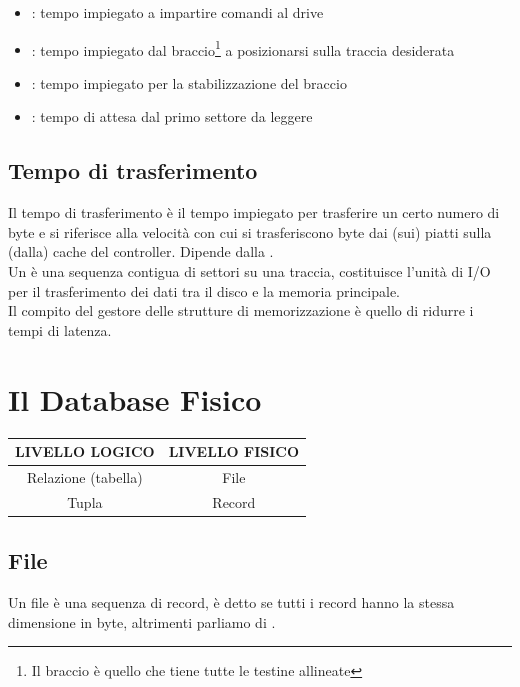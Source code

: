 \documentclass[12pt, a4paper]{report}
\begin{document}
    \begin{itemize}
        \item {}: tempo impiegato a impartire comandi al drive
        \item {}: tempo impiegato dal braccio\footnote{Il braccio è quello che tiene tutte le testine allineate} a posizionarsi sulla traccia desiderata
        \item {}: tempo impiegato per la stabilizzazione del braccio
        \item {}: tempo di attesa dal primo settore da leggere
    \end{itemize}
    \subsection{Tempo di trasferimento}
    Il tempo di trasferimento è il tempo impiegato per trasferire un certo numero di byte e si riferisce alla velocità con cui si trasferiscono byte dai (sui) piatti sulla (dalla) cache del controller. Dipende dalla .\\
    Un  è una sequenza contigua di settori su una traccia, costituisce l'unità di I/O per il trasferimento dei dati tra il disco e la memoria principale.\\
    Il compito del gestore delle strutture di memorizzazione è quello di ridurre i tempi di latenza.
    \section{Il Database Fisico}
    \begin{center}
        \begin{tabular}{| c | c |}
            \hline
            \textbf{LIVELLO LOGICO} & \textbf{LIVELLO FISICO}\\
            \hline
            Relazione (tabella) & File\\
            \hline
            Tupla & Record\\
            \hline
        \end{tabular}
    \end{center}
    \subsection{File}
    Un file è una sequenza di record, è detto  se tutti i record hanno la stessa dimensione in byte, altrimenti parliamo di .
\end{document}
